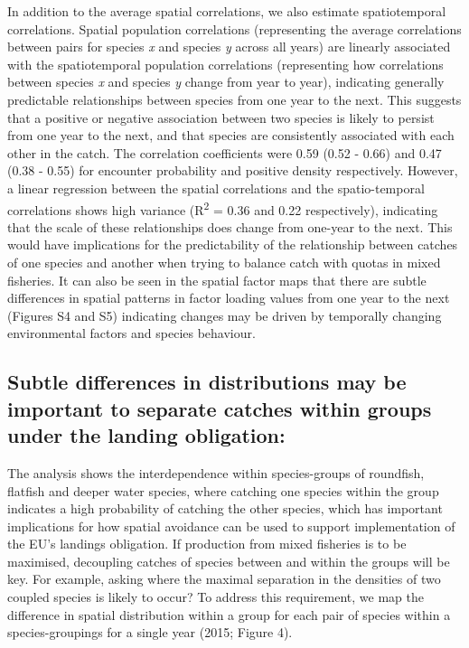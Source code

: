 \documentclass{nature}
\begin{document}
\begin{linenumbers}
In addition to the average spatial correlations, we also estimate
spatiotemporal correlations. Spatial population correlations (representing the
average correlations between pairs for species \textit{x} and species
\textit{y} across all years) are linearly associated with the
spatiotemporal population correlations (representing how correlations between
species \textit{x} and species \textit{y} change from year to
year), indicating generally predictable relationships between species
from one year to the next. This suggests that a positive or negative
association between two species is likely to persist from one year to
the next, and that species are consistently associated with each other
in the catch. The correlation coefficients were 0.59 (0.52 - 0.66) and 0.47
(0.38 - 0.55) for encounter probability and positive density respectively.
However, a linear regression between the spatial correlations and the
spatio-temporal correlations shows high variance (R\textsuperscript{2} = 0.36
and 0.22 respectively), indicating that the scale of these relationships does
change from one-year to the next. This would have implications for the
predictability of the relationship between catches of one species and
another when trying to balance catch with quotas in mixed fisheries. It can
also be seen in the spatial factor maps that there are subtle differences in
spatial patterns in factor loading values from one year to the next (Figures S4
and S5) indicating changes may be driven by temporally changing environmental
factors and species behaviour.


\subsection{Subtle differences in distributions may be important to separate
	catches within groups under the landing obligation:} The analysis shows
the interdependence within species-groups of roundfish, flatfish and deeper
water species, where catching one species within the group indicates a high
probability of catching the other species, which has important implications for
how spatial avoidance can be used to support implementation of the EU's
landings obligation. If production from mixed fisheries is to be maximised,
decoupling catches of species between and within the groups will be key. For
example, asking where the maximal separation in the densities of two coupled
species is likely to occur? To address this requirement, we map the difference
in spatial distribution within a group for each pair of species within a
species-groupings for a single year (2015; Figure 4). 


\end{linenumbers}
\end{document}
